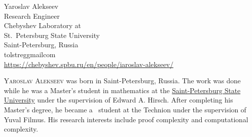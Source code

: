 \documentclass{toc}
\begin{document}

%
%
%


%
%
%
%
%
\begin{tocauthors}
\begin{tocinfo}[alex]
 Yaroslav Alekseev\\
 Research Engineer\\
 Chebyshev Laboratory at \\
 St.~Petersburg State University\\
 Saint-Petersburg, Russia\\
 tolstreg\tocat{}gmail\tocdot{}com \\   %
 \url{https://chebyshev.spbu.ru/en/people/iaroslav-alekseev/}      %
\end{tocinfo}
\end{tocauthors}

%
%
%
%
%
%
%
%
%
%
%
%
%
%
\begin{tocaboutauthors}
\begin{tocabout}[alex]
\textsc{Yaroslav Alekseev} was born in Saint-Petersburg, Russia.  The work
%
was done  
%
while   %
he was a %
Master's  %
student in mathematics at the \href{https://spbu.ru/}{Saint-Petersburg State University} under the
supervision of Edward A. Hirsch. After completing his Master's degree, he became a \phd\ student at
the Technion under the supervision of Yuval Filmus.
%
%
His research interests include proof complexity and computational complexity.  
%
%
\end{tocabout}
\end{tocaboutauthors}
\end{document}
